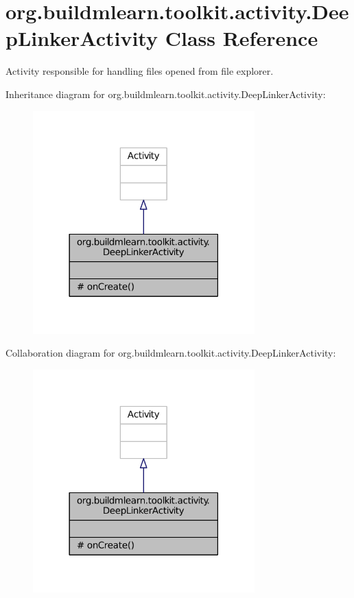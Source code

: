 \hypertarget{classorg_1_1buildmlearn_1_1toolkit_1_1activity_1_1DeepLinkerActivity}{\section{org.\-buildmlearn.\-toolkit.\-activity.\-Deep\-Linker\-Activity Class Reference}
\label{classorg_1_1buildmlearn_1_1toolkit_1_1activity_1_1DeepLinkerActivity}
}


Activity responsible for handling files opened from file explorer.  




Inheritance diagram for org.\-buildmlearn.\-toolkit.\-activity.\-Deep\-Linker\-Activity\-:
\nopagebreak
\begin{figure}[H]
\begin{center}
\leavevmode
\includegraphics[width=242pt]{d6/d40/classorg_1_1buildmlearn_1_1toolkit_1_1activity_1_1DeepLinkerActivity__inherit__graph}
\end{center}
\end{figure}


Collaboration diagram for org.\-buildmlearn.\-toolkit.\-activity.\-Deep\-Linker\-Activity\-:
\nopagebreak
\begin{figure}[H]
\begin{center}
\leavevmode
\includegraphics[width=242pt]{de/dab/classorg_1_1buildmlearn_1_1toolkit_1_1activity_1_1DeepLinkerActivity__coll__graph}
\end{center}
\end{figure}
